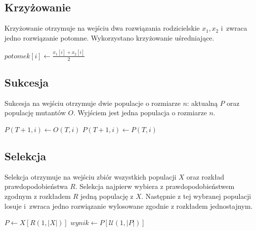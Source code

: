 \documentclass[12pt, a4paper]{article}
\begin{document}
\subsection{Krzyżowanie}

Krzyżowanie otrzymuje na wejściu dwa rozwiązania rodzicielskie $x_1,x_2$ i~zwraca jedno rozwiązanie potomne. 
Wykorzystano krzyżowanie uśredniające.

\begin{algorithm}[H]
\begin{algorithmic}[1]
    \State $potomek[i] \gets \frac{x_1[i] + x_2[i]}{2}$
  \EndFor
\EndFunction
\end{algorithmic}
\end{algorithm}

\subsection{Sukcesja}

Sukcesja na wejściu otrzymuje dwie populacje o rozmiarze $n$: aktualną $P$ oraz populację mutantów $O$.
Wyjściem jest jedna populacja o rozmiarze $n$.

\begin{algorithm}[H]
\begin{algorithmic}[1]
      \State $P(T+1, i) \gets O(T, i)$
    \Else
      \State $P(T+1, i) \gets P(T, i)$
    \EndIf
  \EndFor
\EndFunction
\end{algorithmic}
\end{algorithm}

\subsection{Selekcja}

Selekcja otrzymuje na wejściu zbiór wszystkich populacji $X$ oraz rozkład prawdopodobieństwa $R$.
Selekcja najpierw wybiera z prawdopodobieństwem zgodnym z rozkładem $R$ jedną populację z $X$. Następnie z tej wybranej populacji 
losuje i~zwraca jedno rozwiązanie wylosowane zgodnie z rozkładem jednostajnym.

\begin{algorithm}[H]
\begin{algorithmic}[1]
  \State $P \gets X[R(1, |X|)]$
  \State $wynik \gets P[\mathcal{U}(1, |P|)]$
\EndFunction
\end{algorithmic}
\end{algorithm}
\end{document}
